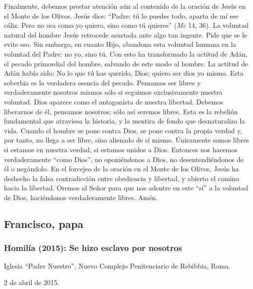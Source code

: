 			\begin{body}Finalmente, debemos prestar atención aún al contenido de la oración de Jesús en el Monte de los Olivos. Jesús dice: “Padre: tú lo puedes todo, aparta de mí ese cáliz. Pero no sea como yo quiero, sino como tú quieres” (\textit{Mc} 14, 36). La voluntad natural del hombre Jesús retrocede asustada ante algo tan ingente. Pide que se le evite eso. Sin embargo, en cuanto Hijo, abandona esta voluntad humana en la voluntad del Padre: no yo, sino tú. Con esto ha transformado la actitud de Adán, el pecado primordial del hombre, salvando de este modo al hombre. La actitud de Adán había sido: No lo que tú has querido, Dios; quiero ser dios yo mismo. Esta soberbia es la verdadera esencia del pecado. Pensamos ser libres y verdaderamente nosotros mismos sólo si seguimos exclusivamente nuestra voluntad. Dios aparece como el antagonista de nuestra libertad. Debemos liberarnos de él, pensamos nosotros; sólo así seremos libres. Esta es la rebelión fundamental que atraviesa la historia, y la mentira de fondo que desnaturaliza la vida. Cuando el hombre se pone contra Dios, se pone contra la propia verdad y, por tanto, no llega a ser libre, sino alienado de sí mismo. Únicamente somos libres si estamos en nuestra verdad, si estamos unidos a Dios. Entonces nos hacemos verdaderamente “como Dios”, no oponiéndonos a Dios, no desentendiéndonos de él o negándolo. En el forcejeo de la oración en el Monte de los Olivos, Jesús ha deshecho la falsa contradicción entre obediencia y libertad, y abierto el camino hacia la libertad. Oremos al Señor para que nos adentre en este “sí” a la voluntad de Dios, haciéndonos verdaderamente libres. Amén.\end{body}
			
			\subsection{Francisco, papa}
			
			\subsubsection{Homilía (2015): Se hizo esclavo por nosotros}
			
			\begin{referencia}Iglesia “Padre Nuestro”, Nuevo Complejo Penitenciario de Rebibbia, Roma.\end{referencia}
			
			\begin{referencia}2 de abril de 2015.\end{referencia}
			
